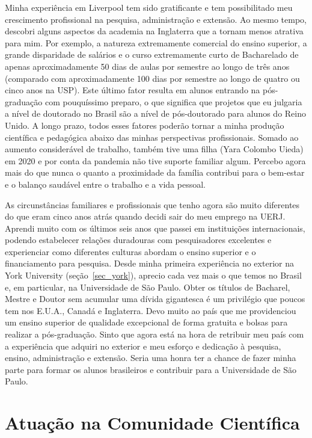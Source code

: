 \documentclass[10pt,a4paper,oneside]{book}
\begin{document}
Minha experiência em Liverpool tem sido gratificante e tem possibilitado meu
crescimento profissional na pesquisa, administração e extensão.
Ao mesmo tempo, descobri alguns aspectos da academia na Inglaterra que a tornam
menos atrativa para mim.
Por exemplo, a natureza extremamente comercial do ensino superior,  a grande
disparidade de salários e o curso extremamente curto de Bacharelado de apenas
aproximadamente 50 dias de aulas por semestre ao longo de três anos (comparado
com aproximadamente 100 dias por semestre ao longo de quatro ou cinco anos na
USP).
Este último fator resulta em alunos entrando na pós-graduação com pouquíssimo
preparo, o que significa que projetos que eu julgaria a nível de doutorado no
Brasil são a nível de pós-doutorado para alunos do Reino Unido.
A longo prazo, todos esses fatores poderão tornar a minha produção científica e
pedagógica abaixo das minhas perspectivas profissionais.
Somado ao aumento considerável de trabalho, também tive uma filha (Yara Colombo
Uieda) em 2020 e por conta da pandemia não tive suporte familiar algum.
Percebo agora mais do que nunca o quanto a proximidade da família contribui
para o bem-estar e o balanço saudável entre o trabalho e a vida pessoal.

As circunstâncias familiares e profissionais que tenho agora são muito
diferentes do que eram cinco anos atrás quando decidi sair do meu emprego na
UERJ.
Aprendi muito com os últimos seis anos que passei em instituições
internacionais, podendo estabelecer relações duradouras com pesquisadores
excelentes e experienciar como diferentes culturas abordam o ensino superior e
o financiamento para pesquisa.
Desde minha primeira experiência no exterior na York University
(seção~\ref{sec_york}), aprecio cada vez mais o que temos no Brasil e, em
particular, na Universidade de São Paulo.
Obter os títulos de Bacharel, Mestre e Doutor sem acumular uma dívida
gigantesca é um privilégio que poucos tem nos E.U.A., Canadá e Inglaterra.
Devo muito ao país que me providenciou um ensino superior de qualidade
excepcional de forma gratuita e bolsas para realizar a pós-graduação.
Sinto que agora está na hora de retribuir meu país com a experiência que
adquiri no exterior e meu esforço e dedicação à pesquisa, ensino, administração
e extensão.
Seria uma honra ter a chance de fazer minha parte para formar os alunos
brasileiros e contribuir para a Universidade de São Paulo.


\section{Atuação na Comunidade Científica}
\label{sec_comunidade}
\end{document}
